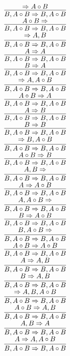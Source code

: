 \documentclass[11pt]{article}
\begin{document}
\begin{center}
\bigskip
\\$\infer{B, A\circ B\Rightarrow B, A\circ B}{\Rightarrow A\circ B}$
\bigskip
\\$\infer{B, A\circ B\Rightarrow B, A\circ B}{A\circ B\Rightarrow }$
\bigskip
\\$\infer{B, A\circ B\Rightarrow B, A\circ B}{\Rightarrow A, B}$
\bigskip
\\$\infer{B, A\circ B\Rightarrow B, A\circ B}{A\Rightarrow A}$
\bigskip
\\$\infer{B, A\circ B\Rightarrow B, A\circ B}{B\Rightarrow A}$
\bigskip
\\$\infer{B, A\circ B\Rightarrow B, A\circ B}{\Rightarrow A, A\circ B}$
\bigskip
\\$\infer{B, A\circ B\Rightarrow B, A\circ B}{A\circ B\Rightarrow A}$
\bigskip
\\$\infer{B, A\circ B\Rightarrow B, A\circ B}{A\Rightarrow B}$
\bigskip
\\$\infer{B, A\circ B\Rightarrow B, A\circ B}{B\Rightarrow B}$
\bigskip
\\$\infer{B, A\circ B\Rightarrow B, A\circ B}{\Rightarrow B, A\circ B}$
\bigskip
\\$\infer{B, A\circ B\Rightarrow B, A\circ B}{A\circ B\Rightarrow B}$
\bigskip
\\$\infer{B, A\circ B\Rightarrow B, A\circ B}{A, B\Rightarrow }$
\bigskip
\\$\infer{B, A\circ B\Rightarrow B, A\circ B}{A\Rightarrow A\circ B}$
\bigskip
\\$\infer{B, A\circ B\Rightarrow B, A\circ B}{A, A\circ B\Rightarrow }$
\bigskip
\\$\infer{B, A\circ B\Rightarrow B, A\circ B}{B\Rightarrow A\circ B}$
\bigskip
\\$\infer{B, A\circ B\Rightarrow B, A\circ B}{B, A\circ B\Rightarrow }$
\bigskip
\\$\infer{B, A\circ B\Rightarrow B, A\circ B}{A\circ B\Rightarrow A\circ B}$
\bigskip
\\$\infer{B, A\circ B\Rightarrow B, A\circ B}{A\Rightarrow A, B}$
\bigskip
\\$\infer{B, A\circ B\Rightarrow B, A\circ B}{B\Rightarrow A, B}$
\bigskip
\\$\infer{B, A\circ B\Rightarrow B, A\circ B}{\Rightarrow A, B, A\circ B}$
\bigskip
\\$\infer{B, A\circ B\Rightarrow B, A\circ B}{A\circ B\Rightarrow A, B}$
\bigskip
\\$\infer{B, A\circ B\Rightarrow B, A\circ B}{A, B\Rightarrow A}$
\bigskip
\\$\infer{B, A\circ B\Rightarrow B, A\circ B}{A\Rightarrow A, A\circ B}$

\end{center}
\end{document}
